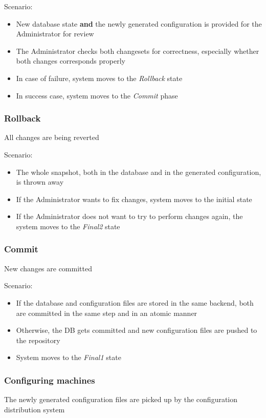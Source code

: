 \documentclass{article}
\begin{document}
Scenario:
\begin{itemize}
    \item{New database state {\bf and} the newly generated configuration is
        provided for the Administrator for review}
    \item{The Administrator checks both changesets for correctness, especially
        whether both changes corresponds properly}
    \item{In case of failure, system moves to the {\em Rollback} state}
    \item{In success case, system moves to the {\em Commit} phase}
\end{itemize}

\subsubsection{Rollback}
All changes are being reverted

Scenario:
\begin{itemize}
    \item{The whole snapshot, both in the database and in the generated
        configuration, is thrown away}
    \item{If the Administrator wants to fix changes, system moves to the initial
        state}
    \item{If the Administrator does not want to try to perform changes again,
        the system moves to the {\em Final2} state}
\end{itemize}

\subsubsection{Commit}
New changes are committed

Scenario:
\begin{itemize}
    \item{If the database and configuration files are stored in the same
        backend, both are committed in the same step and in an atomic manner}
    \item{Otherwise, the DB gets committed and new configuration files are
        pushed to the repository}
    \item{System moves to the {\em Final1} state}
\end{itemize}

\subsubsection{Configuring machines}
The newly generated configuration files are picked up by the configuration
distribution system
\end{document}
